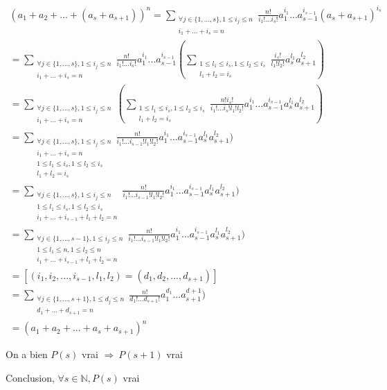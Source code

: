 \begin{multline*}
(a_1 + a_2 + ... + (a_s + a_{s+1}))^n = \sum_{\substack{\forall j \in \{1, ..., s\}, 1 \leq i_j \leq n \\ i_1 + ... + i_s = n}} \frac{n!}{i_1!...i_s!}a_1^{i_1}...a_{s-1}^{i_{s-1}}(a_s + a_{s+1})^{i_s} \\
= \sum_{\substack{\forall j \in \{1, ..., s\}, 1 \leq i_j \leq n \\ i_1 + ... + i_s = n}} \frac{n!}{i_1!...i_s!}a_1^{i_1}...a_{s-1}^{i_{s-1}}(\sum_{\substack{1 \leq l_1 \leq i_s, 1 \leq l_2 \leq i_s  \\ l_1 + l_2 = i_s}} \frac{i_s!}{l_1!l_2!}a_s^{l_1}a_{s+1}^{l_2}) \\
= \sum_{\substack{\forall j \in \{1, ..., s\}, 1 \leq i_j \leq n \\ i_1 + ... + i_s = n}} (\sum_{\substack{1 \leq l_1 \leq i_s, 1 \leq l_2 \leq i_s  \\ l_1 + l_2 = i_s}} \frac{n!i_s!}{i_1!...i_s!l_1!l_2!}a_1^{i_1}...a_{s-1}^{i_{s-1}}a_s^{l_1}a_{s+1}^{l_2}) \\
= \sum_{\substack{\forall j \in \{1, ..., s\}, 1 \leq i_j \leq n \\ i_1 + ... + i_s = n \\ 1 \leq l_1 \leq i_s, 1 \leq l_2 \leq i_s  \\ l_1 + l_2 = i_s}} \frac{n!}{i_1!...i_{s-1}!l_1!l_2!}a_1^{i_1}...a_{s-1}^{i_{s-1}}a_s^{l_1}a_{s+1}^{l_2}) \\
= \sum_{\substack{\forall j \in \{1, ..., s\}, 1 \leq i_j \leq n\\ 1 \leq l_1 \leq i_s, 1 \leq l_2 \leq i_s  \\ i_1 + ... + i_{s-1} + l_1 + l_2 = n}} \frac{n!}{i_1!...i_{s-1}!l_1!l_2!}a_1^{i_1}...a_{s-1}^{i_{s-1}}a_s^{l_1}a_{s+1}^{l_2}) \\
= \sum_{\substack{\forall j \in \{1, ..., s - 1\}, 1 \leq i_j \leq n\\ 1 \leq l_1 \leq n, 1 \leq l_2 \leq n  \\ i_1 + ... + i_{s-1} + l_1 + l_2 = n}} \frac{n!}{i_1!...i_{s-1}!l_1!l_2!}a_1^{i_1}...a_{s-1}^{i_{s-1}}a_s^{l_1}a_{s+1}^{l_2}) \\
= [(i_1, i_2, ..., i_{s-1}, l_1, l_2) = (d_1, d_2, ..., d_{s+1})] \\
= \sum_{\substack{\forall j \in \{1, ..., s + 1\}, 1 \leq d_j \leq n \\ d_1 + ... + d_{s+1} = n}} \frac{n!}{d_1!...d_{s+1}!}a_1^{d_1}...a_{s+1}^{d+1}) \\
= (a_1 + a_2 + ... + a_s + a_{s+1})^n
\end{multline*}


On a bien $P(s)$ vrai $\Longrightarrow\ P(s+1)$ vrai

Conclusion, $\forall s \in \mathbb{N}, P(s)$ vrai
